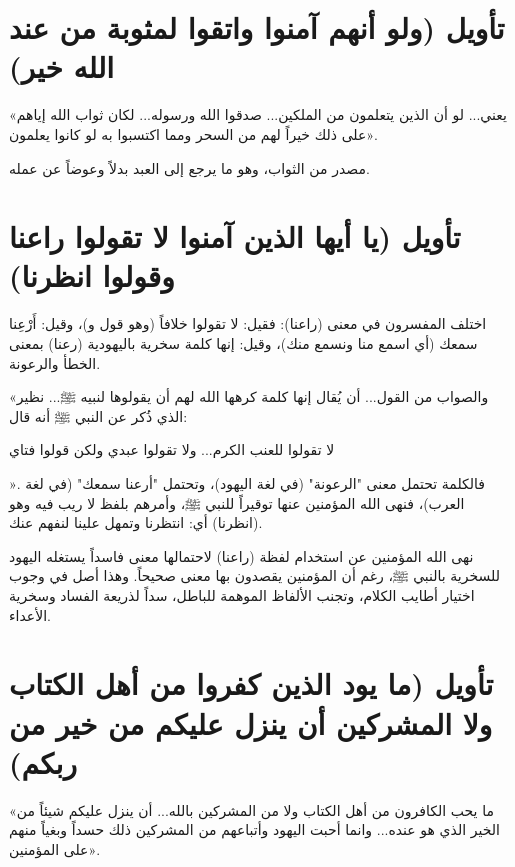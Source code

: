 \separator

\section{تأويل (ولو أنهم آمنوا واتقوا لمثوبة من عند الله خير)}
 «يعني... لو أن الذين يتعلمون من الملكين... صدقوا الله ورسوله... لكان ثواب الله إياهم على ذلك خيراً لهم من السحر ومما اكتسبوا به لو كانوا يعلمون».

 مصدر من الثواب، وهو ما يرجع إلى العبد بدلاً وعوضاً عن عمله.

\separator

\section{تأويل (يا أيها الذين آمنوا لا تقولوا راعنا وقولوا انظرنا)}
اختلف المفسرون في معنى (راعنا): فقيل: لا تقولوا خلافاً (وهو قول  و)، وقيل: أَرْعِنا سمعك (أي اسمع منا ونسمع منك)، وقيل: إنها كلمة سخرية باليهودية (رعنا) بمعنى الخطأ والرعونة.

 «والصواب من القول... أن يُقال إنها كلمة كرهها الله لهم أن يقولوها لنبيه ﷺ... نظير الذي ذُكر عن النبي ﷺ أنه قال: \begin{hadith}لا تقولوا للعنب الكرم... ولا تقولوا عبدي ولكن قولوا فتاي\end{hadith}».
فالكلمة تحتمل معنى "الرعونة" (في لغة اليهود)، وتحتمل "أرعنا سمعك" (في لغة العرب)، فنهى الله المؤمنين عنها توقيراً للنبي ﷺ، وأمرهم بلفظ لا ريب فيه وهو (انظرنا) أي: انتظرنا وتمهل علينا لنفهم عنك.

\begin{fawaid}
نهى الله المؤمنين عن استخدام لفظة (راعنا) لاحتمالها معنى فاسداً يستغله اليهود للسخرية بالنبي ﷺ، رغم أن المؤمنين يقصدون بها معنى صحيحاً. وهذا أصل في وجوب اختيار أطايب الكلام، وتجنب الألفاظ الموهمة للباطل، سداً لذريعة الفساد وسخرية الأعداء.
\end{fawaid}

\separator

\section{تأويل (ما يود الذين كفروا من أهل الكتاب ولا المشركين أن ينزل عليكم من خير من ربكم)}
 «ما يحب الكافرون من أهل الكتاب ولا من المشركين بالله... أن ينزل عليكم شيئاً من الخير الذي هو عنده... وانما أحبت اليهود وأتباعهم من المشركين ذلك حسداً وبغياً منهم على المؤمنين».

